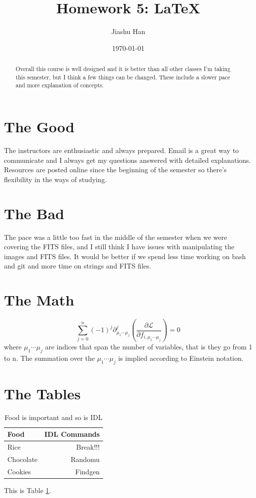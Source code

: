 \documentclass[12pt]{article}
\begin{document}
  \title{Homework 5: \LaTeX}
  \author{Jiashu Han}
  \date{\today}
  \maketitle
  
  \begin{abstract}
  Overall this course is well designed and it is better than all other classes I'm taking this semester, but I think a few things can be changed. These include a slower pace and more explanation of concepts.
  \end{abstract}

  \section{The Good}
  The instructors are enthusiastic and always prepared. Email is a great way to communicate and I always get my questions answered with detailed explanations. Resources are posted online since the beginning of the semester so there's flexibility in the ways of studying.

  \section{The Bad}
  The pace was a little too fast in the middle of the semester when we were covering the FITS files, and I still think I have issues with manipulating the images and FITS files. It would be better if we spend less time working on bash and git and more time on strings and FITS files. 

  \section{The Math}
    \begin{equation}
      \sum_{j=0}^{n} (-1)^{j} \partial^{j}_{\mu_{1} \dotsb \mu_{j}} \left(\frac{\partial \mathcal{L}}{\partial f_{i,\mu_1 \dotsb \mu_j}}\right) = 0
      \label{eq:1}
    \end{equation}
    where $\mu_1 \dotsb \mu_j$ are indices that span the number of variables, that is they go from 1 to n. The summation over the $\mu_1 \dotsb \mu_j$ is implied according to Einstein notation.

  \section{The Tables}
    \begin{center}
      \begin{table}
        \centering
        \begin{tabular}{||l|r||}
          \hline
          Food & IDL Commands \\
          \hline
          Rice & Break!!! \\
          Chocolate & Randomu \\
          Cookies & Findgen \\
          \hline
        \end{tabular}
        \caption{Food is important and so is IDL} \label{table:1}
      \end{table}
    \end{center}
    This is Table \ref{table:1}.
\end{document}
